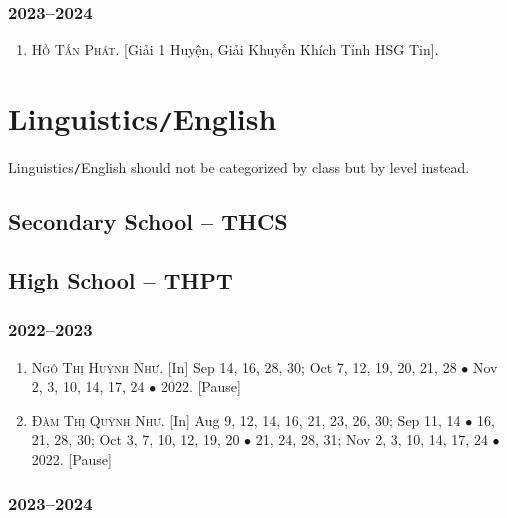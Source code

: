 \documentclass{article}
\begin{document}
\subsubsection{2023--2024}

\begin{enumerate}
	\item \textsc{Hồ Tấn Phát.} [Giải 1 Huyện, Giải Khuyến Khích Tỉnh HSG Tin].
\end{enumerate}


\section{Linguistics\texttt{/}English}
Linguistics\texttt{/}English should not be categorized by class but by level instead.

\subsection{Secondary School -- THCS}


\subsection{High School -- THPT}

\subsubsection{2022--2023}

\begin{enumerate}
	\item \textsc{Ngô Thị Huỳnh Như.} \textsf{[In]} Sep 14, 16, 28, 30; Oct 7, 12, 19, 20, 21, 28 $\bullet$ Nov 2, 3, 10, 14, 17, 24 $\bullet$ 2022. \textsf{[Pause]}
	\item \textsc{Đàm Thị Quỳnh Như.} \textsf{[In]} Aug 9, 12, 14, 16, 21, 23, 26, 30; Sep 11, 14 $\bullet$ 16, 21, 28, 30; Oct 3, 7, 10, 12, 19, 20 $\bullet$ 21, 24, 28, 31; Nov 2, 3, 10, 14, 17, 24 $\bullet$ 2022. \textsf{[Pause]}
\end{enumerate}

\subsubsection{2023--2024}


\printbibliography[heading=bibintoc]
	
\end{document}
